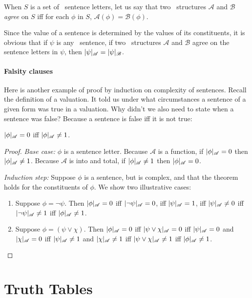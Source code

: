 \begin{definition}
	When $S$ is a set of \lone\ sentence letters, let us say that two \lone\ structures $\mathscr{A}$ and $\mathscr{B}$ \emph{agree} on $S$ iff for each $\phi$ in $S$, $\mathscr{A}(\phi) = \mathscr{B}(\phi)$. 
\end{definition}
Since the value of a sentence is determined by the values of its constituents, it is obvious that if $\psi$ is any \lone\ sentence, if two \lone\ structures $\mathscr{A}$ and $\mathscr{B}$ agree on the sentence letters in $\psi$, then $|\psi|_{\mathscr{A}}=|\psi|_{\mathscr{B}}$.  

\paragraph{Falsity clauses} Here is another example of proof by induction on complexity of sentences. Recall the definition of a valuation. It told us under what circumstances a sentence of a given form was true in a valuation. Why didn't we also need to state when a sentence was false? Because a sentence is false iff it is not true:
\begin{theorem}
		$|\phi|_{\mathscr{A}}=0$ iff $|\phi|_{\mathscr{A}}\neq 1$.
		\begin{proof}
			{\em Base case:} $\phi$ is a sentence letter. Because $\mathscr{A}$ is a function, if $|\phi|_{\mathscr{A}}=0$ then $|\phi|_{\mathscr{A}} \neq 1$. Because $\mathscr{A}$ is into and total, if $|\phi|_{\mathscr{A}}\neq 1$ then $|\phi|_{\mathscr{A}}=0$.

			{\em Induction step:} Suppose $\phi$ is a sentence, but is complex, and that the theorem holds for the constituents of $\phi$. We show two illustrative cases: \begin{enumerate}
				\item Suppose $\phi = \neg \psi$. Then $|\phi|_{\mathscr{A}}=0$ iff $|\neg \psi|_{\mathscr{A}}=0$, iff $|\psi|_{\mathscr{A}} = 1$, iff $|\psi|_{\mathscr{A}}\neq 0$ iff $|\neg\psi|_{\mathscr{A}}\neq 1$ iff $|\phi|_{\mathscr{A}}\neq 1$.
				\item Suppose $\phi = (\psi \vee \chi)$. Then $|\phi|_{\mathscr{A}} = 0$ iff $|\psi \vee \chi|_{\mathscr{A}}=0$ iff $|\psi|_{\mathscr{A}}=0$ and $|\chi|_{\mathscr{A}}=0$ iff $|\psi|_{\mathscr{A}}\neq 1$ and $|\chi|_{\mathscr{A}} \neq 1$ iff  $|\psi\vee\chi|_{\mathscr{A}}\neq 1$ iff $|\phi|_{\mathscr{A}}\neq 1$.
			\end{enumerate}
		\end{proof}
	\end{theorem}

\section{Truth Tables}

